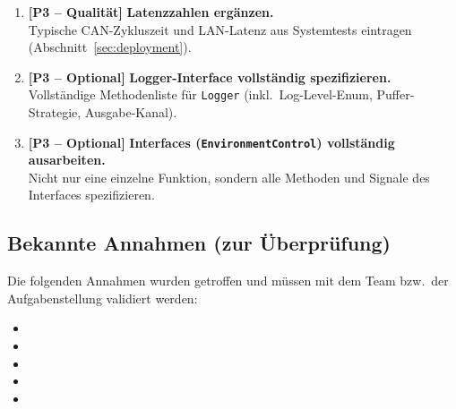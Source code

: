\begin{enumerate}
  \item \textbf{[P3 – Qualität]}
    \textbf{Latenzzahlen ergänzen.} \\
    Typische \ac{CAN}-Zykluszeit und \ac{LAN}-Latenz aus Systemtests eintragen
    (Abschnitt~\ref{sec:deployment}).

  \item \textbf{[P3 – Optional]}
    \textbf{Logger-Interface vollständig spezifizieren.} \\
    Vollständige Methodenliste für \texttt{Logger} (inkl.\ Log-Level-Enum,
    Puffer-Strategie, Ausgabe-Kanal).

  \item \textbf{[P3 – Optional]}
    \textbf{Interfaces (\texttt{EnvironmentControl}) vollständig ausarbeiten.} \\
    Nicht nur eine einzelne Funktion, sondern alle Methoden und Signale
    des Interfaces spezifizieren.
\end{enumerate}

\subsection{Bekannte Annahmen (zur Überprüfung)}

Die folgenden Annahmen wurden getroffen und müssen mit dem Team
bzw.\ der Aufgabenstellung validiert werden:

\begin{itemize}
  \item {}
  \item {}
  \item {}
  \item {}
  \item {}
\end{itemize}
